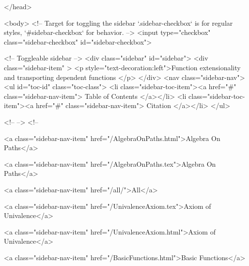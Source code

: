   
</head>




  <body>
    <!-- Target for toggling the sidebar `.sidebar-checkbox` is for regular
     styles, `#sidebar-checkbox` for behavior. -->
<input type="checkbox" class="sidebar-checkbox" id="sidebar-checkbox">

<!-- Toggleable sidebar -->
<div class="sidebar" id="sidebar">
  <div class="sidebar-item" >
    <p style="text-decoration:left">Function extensionality and transporting dependent functions </p>
  </div>
  <nav class="sidebar-nav">
    <ul id="toc-id" class="toc-class">
  <li class="sidebar-toc-item"><a href="#" class="sidebar-nav-item"> Table of Contents </a></li>
  <li class="sidebar-toc-item"><a href="#" class="sidebar-nav-item"> Citation </a></li>
</ul>


    <!--  -->
    <!-- 
      
    
      
    
      
    
      
        
      
    
      
        
          <a class="sidebar-nav-item" href="/AlgebraOnPaths.html">Algebra On Paths</a>
        
      
    
      
        
          <a class="sidebar-nav-item" href="/AlgebraOnPaths.tex">Algebra On Paths</a>
        
      
    
      
        
          <a class="sidebar-nav-item" href="/all/">All</a>
        
      
    
      
        
          <a class="sidebar-nav-item" href="/UnivalenceAxiom.tex">Axiom of Univalence</a>
        
      
    
      
        
          <a class="sidebar-nav-item" href="/UnivalenceAxiom.html">Axiom of Univalence</a>
        
      
    
      
        
          <a class="sidebar-nav-item" href="/BasicFunctions.html">Basic Functions</a>
        
      
    
      
        
